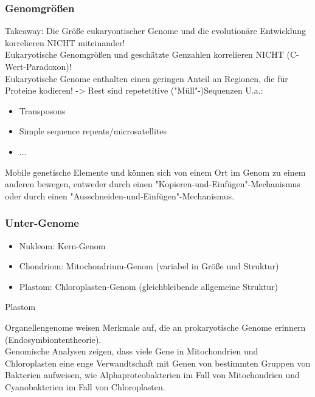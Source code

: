 \subsubsection{Genomgrößen}
Takeaway: Die Größe eukaryontischer Genome und die evolutionäre Entwicklung korrelieren NICHT miteinander! \\
Eukaryotische Genomgrößen und geschätzte Genzahlen korrelieren NICHT (\gls{C-Wert}-Paradoxon)! \\  %
\noindent Eukaryotische Genome enthalten einen geringen Anteil an Regionen, die für Proteine kodieren! -> Rest sind repetetitive ("Müll"-)Sequenzen 
U.a.: 
\begin{itemize}
    \item \glspl{Transposon} 
    \item Simple sequence repeats/microsatellites 
    \item ...
\end{itemize}
\begin{mechanism}[title=Definition Transposon]
Mobile genetische Elemente und können sich von einem Ort im Genom zu einem anderen bewegen, entweder durch einen "Kopieren-und-Einfügen"-Mechanismus oder durch einen "Ausschneiden-und-Einfügen"-Mechanismus.
\end{mechanism}
\subsubsection{Unter-Genome}
\begin{mechanism}[title=Bennen Sie die drei (Sub)Genome einer eukaryotischen Zelle]
\begin{itemize}
    \item Nukleom: Kern-Genom 
    \item Chondriom: Mitochondrium-Genom (variabel in Größe und Struktur) 
    \item Plastom: Chloroplasten-Genom (gleichbleibende allgemeine Struktur) 
\end{itemize}
\end{mechanism}
\begin{mechanism}[title=Welches Genom gibt es nur in Pflanzenzellen?]
Plastom
\end{mechanism}
\begin{mechanism}[title=Was weißt auf den prokaryotischen Ursprung einiger dieser Genome hin?]
Organellengenome weisen Merkmale auf, die an prokaryotische Genome erinnern (Endosymbiontentheorie). \\
Genomische Analysen zeigen, dass viele Gene in Mitochondrien und Chloroplasten eine enge Verwandtschaft mit Genen von bestimmten Gruppen von Bakterien aufweisen, wie Alphaproteobakterien im Fall von Mitochondrien und Cyanobakterien im Fall von Chloroplasten.
\end{mechanism}

